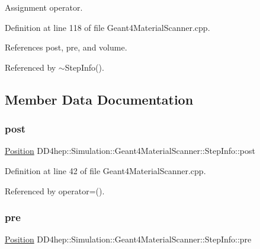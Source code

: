 Assignment operator. 



Definition at line 118 of file Geant4\+Material\+Scanner.\+cpp.



References post, pre, and volume.



Referenced by $\sim$\+Step\+Info().



\subsection{Member Data Documentation}
\hypertarget{class_d_d4hep_1_1_simulation_1_1_geant4_material_scanner_1_1_step_info_a0fd16194cb4eeb622e8e1485d3881688}{}\label{class_d_d4hep_1_1_simulation_1_1_geant4_material_scanner_1_1_step_info_a0fd16194cb4eeb622e8e1485d3881688} 
\subsubsection{\texorpdfstring{post}{post}}
{\footnotesize\ttfamily \hyperlink{namespace_d_d4hep_1_1_geometry_a55083902099d03506c6db01b80404900}{Position} D\+D4hep\+::\+Simulation\+::\+Geant4\+Material\+Scanner\+::\+Step\+Info\+::post}



Definition at line 42 of file Geant4\+Material\+Scanner.\+cpp.



Referenced by operator=().

\hypertarget{class_d_d4hep_1_1_simulation_1_1_geant4_material_scanner_1_1_step_info_a8a5e62192e0103b052eb2c5885366aec}{}\label{class_d_d4hep_1_1_simulation_1_1_geant4_material_scanner_1_1_step_info_a8a5e62192e0103b052eb2c5885366aec} 
\subsubsection{\texorpdfstring{pre}{pre}}
{\footnotesize\ttfamily \hyperlink{namespace_d_d4hep_1_1_geometry_a55083902099d03506c6db01b80404900}{Position} D\+D4hep\+::\+Simulation\+::\+Geant4\+Material\+Scanner\+::\+Step\+Info\+::pre}



